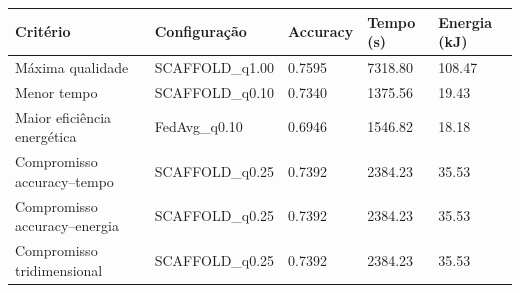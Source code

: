 \begin{tabular}{lllll}
\toprule
Critério & Configuração & Accuracy & Tempo (s) & Energia (kJ) \\
\midrule
Máxima qualidade & SCAFFOLD\_q1.00 & 0.7595 & 7318.80 & 108.47 \\
Menor tempo & SCAFFOLD\_q0.10 & 0.7340 & 1375.56 & 19.43 \\
Maior eficiência energética & FedAvg\_q0.10 & 0.6946 & 1546.82 & 18.18 \\
Compromisso accuracy--tempo & SCAFFOLD\_q0.25 & 0.7392 & 2384.23 & 35.53 \\
Compromisso accuracy--energia & SCAFFOLD\_q0.25 & 0.7392 & 2384.23 & 35.53 \\
Compromisso tridimensional & SCAFFOLD\_q0.25 & 0.7392 & 2384.23 & 35.53 \\
\bottomrule
\end{tabular}

